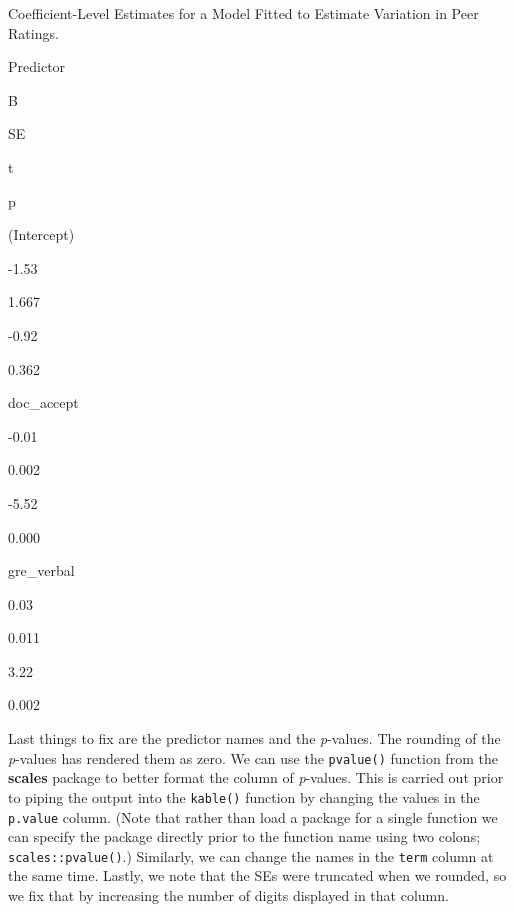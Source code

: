 \documentclass[]{book}
\newenvironment{Shaded}{\begin{snugshade}}{\end{snugshade}}
\newcommand{\DataTypeTok}[1]{\textcolor[rgb]{0.13,0.29,0.53}{#1}}
\newcommand{\DecValTok}[1]{\textcolor[rgb]{0.00,0.00,0.81}{#1}}
\newcommand{\KeywordTok}[1]{\textcolor[rgb]{0.13,0.29,0.53}{\textbf{#1}}}
\newcommand{\NormalTok}[1]{#1}
\newcommand{\OperatorTok}[1]{\textcolor[rgb]{0.81,0.36,0.00}{\textbf{#1}}}
\newcommand{\StringTok}[1]{\textcolor[rgb]{0.31,0.60,0.02}{#1}}
\begin{document}
\begin{Shaded}
\end{Shaded}

\label{tab:unnamed-chunk-17}Coefficient-Level Estimates for a Model Fitted to Estimate Variation in Peer Ratings.

Predictor

B

SE

t

p

(Intercept)

-1.53

1.667

-0.92

0.362

doc\_accept

-0.01

0.002

-5.52

0.000

gre\_verbal

0.03

0.011

3.22

0.002

Last things to fix are the predictor names and the \emph{p}-values. The rounding of the \emph{p}-values has rendered them as zero. We can use the \texttt{pvalue()} function from the \textbf{scales} package to better format the column of \emph{p}-values. This is carried out prior to piping the output into the \texttt{kable()} function by changing the values in the \texttt{p.value} column. (Note that rather than load a package for a single function we can specify the package directly prior to the function name using two colons; \texttt{scales::pvalue()}.) Similarly, we can change the names in the \texttt{term} column at the same time. Lastly, we note that the SEs were truncated when we rounded, so we fix that by increasing the number of digits displayed in that column.
\end{document}
